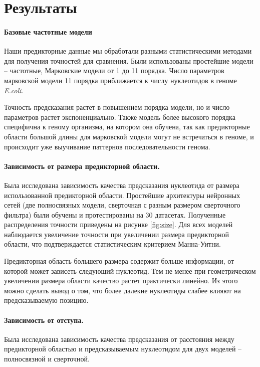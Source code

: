 \section{Результаты}
\newcommand{\mannwhitni}{{\footnotesize Значимость отличия выборок по критерию Манна-Уитни: ns $P>0.05$, * $P\leq 0.05$, ** $P\leq 0.01$, *** $P\leq 0.001$}}

\paragraph{Базовые частотные модели} Наши предикторные данные мы обработали разными статистическими методами для получения точностей для сравнения. Были использованы простейшие модели -- частотные, Марковские модели от 1 до 11 порядка. Число параметров марковской модели 11 порядка приближается к числу нуклеотидов в геноме \emph{E.coli}.

Точность предсказания растет в повышением порядка модели, но и число параметров растет экспоненциально. Также модель более высокого порядка специфична к геному организма, на котором она обучена, так как предикторные области большой длины для марковской модели могут не встречаться в геноме, и происходит уже выучивание паттернов последовательности генома.




\paragraph{Зависимость от размера предикторной области.} Была исследована зависимость качества предсказания нуклеотида от размера использованной предикторной области. Простейшие архитектуры нейронных сетей (две полносвязных модели, сверточная с разным размером сверточного фильтра) были обучены и протестированы на 30 датасетах. Полученные распределения точности приведены на рисунке \ref{fig:size}. Для всех моделей наблюдается увеличение точности при увеличении размера предикторной области, что подтверждается статистическим критерием Манна-Уитни.

Предикторная область большего размера содержит больше информации, от которой может зависеть следующий нуклеотид. Тем не менее при геометрическом увеличении размера области качество растет практически линейно. Из этого можно сделать вывод о том, что более далекие нуклеотиды слабее влияют на предсказываемую позицию.



\paragraph{Зависимость от отступа.} Была исследована зависимость качества предсказания от расстояния между предикторной областью и предсказываемым нуклеотидом для двух моделей -- полносвязной и сверточной. 

